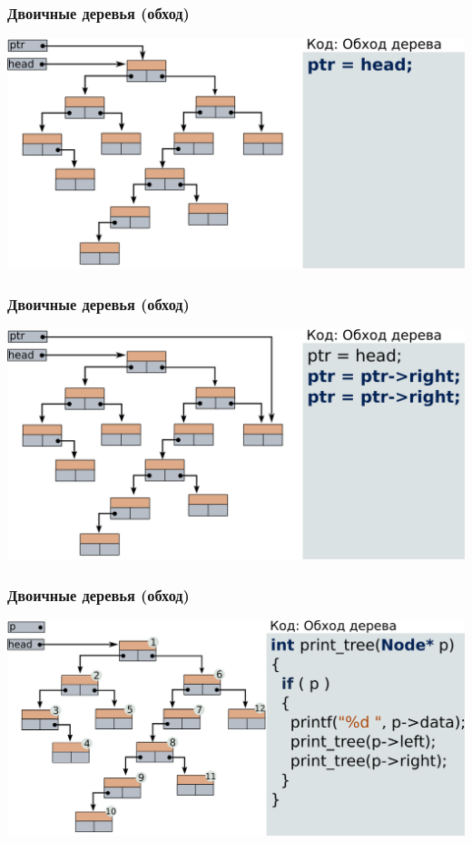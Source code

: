 \documentclass[14pt,pdf,hyperref={unicode}]{beamer}
\begin{document}
\begin{frame}[fragile]
\frametitle{Двоичные деревья (обход)}  
\begin{center}
\includegraphics[width=0.99\linewidth]{images/bintree_traversal_1.png}
\end{center}
\end{frame}

\begin{frame}[fragile]
\frametitle{Двоичные деревья (обход)}  
\begin{center}
\includegraphics[width=0.99\linewidth]{images/bintree_traversal_2.png}
\end{center}
\end{frame}

\begin{frame}[fragile]
\frametitle{Двоичные деревья (обход)}  
\begin{center}
\includegraphics[width=0.99\linewidth]{images/bintree_traversal_3.png}
\end{center}
\end{frame}
\end{document}
